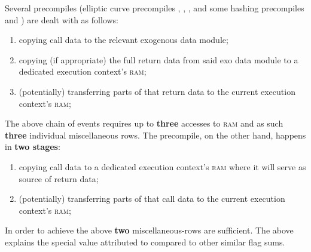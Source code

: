 \saNote{}
Several precompiles (elliptic curve precompiles \instEcrecover{}, \instEcadd{}, \instEcmul{}, \instEcpairing{}
and some hashing precompiles \instShaTwo{} and \instRipemd{})
are dealt with as follows:
\begin{enumerate}
	\item copying call data to the relevant exogenous data module;
	\item copying (if appropriate) the full return data from said exo data module to a dedicated execution context's \textsc{ram};
	\item (potentially) transferring parts of that return data to the current execution context's \textsc{ram};
\end{enumerate}
The above chain of events requires up to \textbf{three} accesses to \textsc{ram} and as such \textbf{three} individual miscellaneous rows.
The \instIdentity{} precompile, on the other hand, happens in \textbf{two stages}:
\begin{enumerate}
	\item copying call data to a dedicated execution context's \textsc{ram} where it will serve as source of return data;
	\item (potentially) transferring parts of that call data to the current execution context's \textsc{ram};
\end{enumerate}
In order to achieve the above \textbf{two} miscellaneous-rows are sufficient.
The above explains the special value attributed to \locFlagSumIdentitySuccess{} compared to other similar flag sums.
